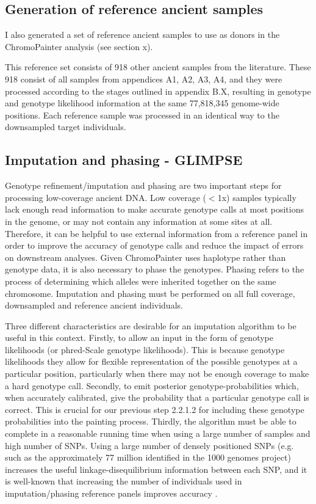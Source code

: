 \subsection{Generation of reference ancient samples}

I also generated a set of reference ancient samples to use as donors in the ChromoPainter analysis (see section x).

This reference set consists of 918 other ancient samples from the literature. These 918 consist of all samples from appendices A1, A2, A3, A4, and they were processed according to the stages outlined in appendix B.X, resulting in genotype and genotype likelihood information at the same 77,818,345 genome-wide positions. Each reference sample was processed in an identical way to the downsampled target individuals. 

\subsection{Imputation and phasing - GLIMPSE}

Genotype refinement/imputation and phasing are two important steps for processing low-coverage ancient DNA. Low coverage ($<$1x) samples typically lack enough read information to make accurate genotype calls at most positions in the genome, or may not contain any information at some sites at all. Therefore, it can be helpful to use external information from a reference panel in order to improve the accuracy of genotype calls and reduce the impact of errors on downstream analyses. Given ChromoPainter uses haplotype rather than genotype data, it is also necessary to phase the genotypes. Phasing refers to the process of determining which alleles were inherited together on the same chromosome. Imputation and phasing must be performed on all full coverage, downsampled and reference ancient individuals. 

Three different characteristics are desirable for an imputation algorithm to be useful in this context. Firstly, to allow an input in the form of genotype likelihoods (or phred-Scale genotype likelihoods). This is because genotype likelihoods they allow for flexible representation of the possible genotypes at a particular position, particularly when there may not be enough coverage to make a hard genotype call. Secondly, to emit posterior genotype-probabilities which, when accurately calibrated, give the probability that a particular genotype call is correct. This is crucial for our previous step 2.2.1.2 for including these genotype probabilities into the painting process. Thirdly, the algorithm must be able to complete in a reasonable running time when using a large number of samples and high number of SNPs. Using a large number of densely positioned SNPs (e.g. such as the approximately 77 million identified in the 1000 genomes project) increases the useful linkage-disequilibrium information between each SNP, and it is well-known that increasing the number of individuals used in imputation/phasing reference panels improves accuracy \cite{delaneau2018integrative, HUANG2009235, mccarthy2016reference, rubinacci2021efficient}. 

